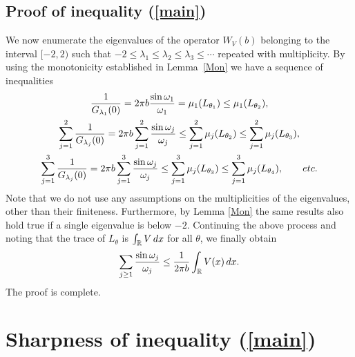 \documentclass[11pt]{article}
\numberwithin{equation}{section}
\numberwithin{equation}{section}
\newcommand{\R}{\mathbb{R}}
\begin{document}
\subsection[Proof of inequality (1.2)]{Proof of inequality (\ref{main})}

We now enumerate the eigenvalues of the operator $W_V(b)$ belonging to the interval $[-2,2)$ such that
$-2\le \lambda_1\le\lambda_2\le\lambda_3\le \cdots$ repeated with multiplicity.
By using the monotonicity established in Lemma~\ref{Mon} we have a sequence of inequalities
\begin{gather*}
\frac{1}{G_{\lambda_1}(0)} =2\pi b \frac{\sin\omega_1}{\omega_1} = \mu_1(L_{\theta_1}) \le \mu_1(L_{\theta_2}),
\\
\sum_{j=1}^2 \frac{1}{G_{\lambda_j}(0)} = 2\pi b \sum_{j=1}^2 \frac{\sin\omega_j}{\omega_j}
\le \sum_{j=1}^2 \mu_j(L_{\theta_2})
\le \sum_{j=1}^2 \mu_j(L_{\theta_3}),
\\
\sum_{j=1}^3 \frac{1}{G_{\lambda_j}(0)} = 2\pi b \sum_{j=1}^3 \frac{\sin\omega_j}{\omega_j}
\le \sum_{j=1}^3 \mu_j(L_{\theta_3})
\le \sum_{j=1}^3 \mu_j(L_{\theta_4}), \qquad {\rm etc}.
\end{gather*}
Note that we do not use any assumptions on the multiplicities of the eigenvalues, other than their finiteness. Furthermore, by Lemma \ref{Mon} the same results also hold true if a single eigenvalue is below $-2$.
Continuing the above process and noting that the trace of $L_{\theta}$ is $\int_\R V \, {\rm d} x$ for all $\theta$, we finally obtain
\begin{gather*}
\sum_{j\ge1}\frac{\sin\omega_j}{\omega_j}\le \frac{1}{2\pi b}\int_{\R}V(x)\, {\rm d} x.
\end{gather*}
The proof is complete.


\section[Sharpness of inequality (1.2)]{Sharpness of inequality (\ref{main})}\label{sec:sharp}
\end{document}
